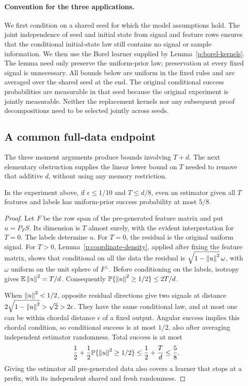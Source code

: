 \paragraph{Convention for the three applications.}
We first condition on a shared seed for which the model assumptions hold.
The joint independence of seed and initial state from signal and feature
rows ensures that the conditional initial-state law still contains no
signal or sample information. We then use the Borel learner supplied by
Lemma~\ref{p:borel-kernels}. The lemma need only preserve the
uniform-prior law; preservation at every fixed signal is unnecessary.
All bounds below are uniform in the fixed rules and are averaged over the
shared seed at the end. The original conditional success probabilities
are measurable in that seed because the original experiment is jointly
measurable. Neither the replacement kernels nor any subsequent proof
decompositions need to be selected jointly across seeds.

\subsection{A common full-data endpoint}

The three moment arguments produce bounds involving \(T+d\). The next
elementary obstruction supplies the linear lower bound on \(T\) needed
to remove that additive \(d\), without using any memory restriction.

\begin{lemma}\label{p:haar-linear}
In the experiment above, if \(\epsilon\le1/10\) and \(T\le d/8\),
even an estimator given all \(T\) features and labels has uniform-prior
success probability at most \(5/8\).
\end{lemma}

\begin{proof}
Let \(F\) be the row span of the pre-generated feature matrix and put
\(u=P_FS\). Its dimension is \(T\) almost surely, with the evident
interpretation for \(T=0\). The labels determine \(u\).
For \(T=0\), the residual is the original uniform signal. For \(T>0\),
Lemma~\ref{p:coordinate-density}, applied after fixing the feature matrix,
shows that conditional on all the data the residual is
\(\sqrt{1-\left\lVert u\right\rVert^2}\,\omega\), with \(\omega\) uniform on the unit
sphere of \(F^\perp\). Before conditioning on the labels, isotropy gives
\(\mathbb E\left\lVert u\right\rVert^2=T/d\). Consequently
\(\mathbb P\{\left\lVert u\right\rVert^2\ge1/2\}\le2T/d\).

When \(\left\lVert u\right\rVert^2<1/2\), opposite residual directions give two signals
at distance \(2\sqrt{1-\left\lVert u\right\rVert^2}>\sqrt2>2\epsilon\). They have the same
conditional law, and at most one can be within chordal distance
\(\epsilon\) of a fixed output. Angular success implies this chordal
condition, so conditional success is at most \(1/2\), also after
averaging independent estimator randomness. Total success is at most
\[
 \frac12+\frac12\mathbb P\{\left\lVert u\right\rVert^2\ge1/2\}
 \le\frac12+\frac Td\le\frac58.
\]
Giving the estimator all pre-generated data also covers a learner that
stops at a prefix, with its independent shared and fresh randomness.
\end{proof}
